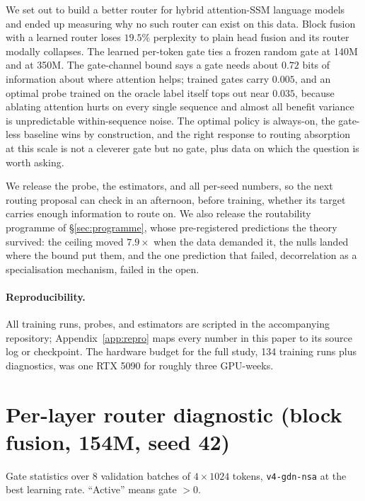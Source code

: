 \documentclass[11pt,a4paper]{article}
\begin{document}
We set out to build a better router for hybrid attention-SSM language
models and ended up measuring why no such router can exist on this data.
Block fusion with a learned router loses $19.5\%$ perplexity to plain
head fusion and its router modally collapses. The learned per-token gate
ties a frozen random gate at 140M and at 350M. The gate-channel bound
says a gate needs about $0.72$ bits of information about where attention
helps; trained gates carry $0.005$, and an optimal probe trained on the
oracle label itself tops out near $0.035$, because ablating attention
hurts on every single sequence and almost all benefit variance is
unpredictable within-sequence noise. The optimal policy is always-on,
the gate-less baseline wins by construction, and the right response to
routing absorption at this scale is not a cleverer gate but no gate,
plus data on which the question is worth asking.

We release the probe, the estimators, and all per-seed numbers, so the
next routing proposal can check in an afternoon, before training,
whether its target carries enough information to route on. We also
release the routability programme of \S\ref{sec:programme}, whose
pre-registered predictions the theory survived: the ceiling moved
$7.9\times$ when the data demanded it, the nulls landed where the bound
put them, and the one prediction that failed, decorrelation as a
specialisation mechanism, failed in the open.

\paragraph{Reproducibility.} All training runs, probes, and estimators
are scripted in the accompanying repository; Appendix~\ref{app:repro}
maps every number in this paper to its source log or checkpoint. The
hardware budget for the full study, 134 training runs plus diagnostics,
was one RTX 5090 for roughly three GPU-weeks.

\appendix

\section{Per-layer router diagnostic (block fusion, 154M, seed 42)}
\label{app:router}

Gate statistics over 8 validation batches of $4 \times 1024$ tokens,
\texttt{v4-gdn-nsa} at the best learning rate. ``Active'' means gate
$> 0$.
\end{document}
